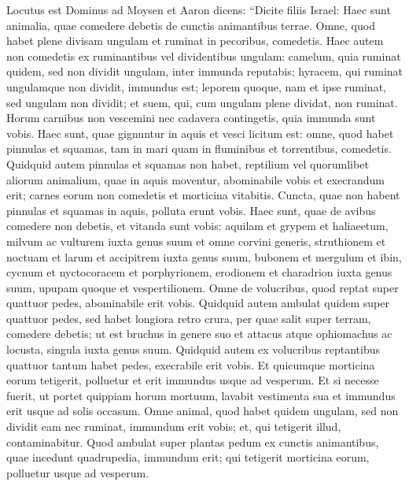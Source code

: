 \begin{biblechapter}  
\verse Locutus est Dominus ad Moysen et Aaron dicens: 
\verse “Dicite filiis Israel: Haec sunt animalia, quae comedere debetis de cunctis animantibus terrae. 
\verse Omne, quod habet plene divisam ungulam et ruminat in pecoribus, comedetis.  
\verse Haec autem non comedetis ex ruminantibus vel dividentibus ungulam: camelum, quia ruminat quidem, sed non dividit ungulam, inter immunda reputabis; 
\verse hyracem, qui ruminat ungulamque non dividit, immundus est; 
\verse leporem quoque, nam et ipse ruminat, sed ungulam non dividit; 
\verse et suem, qui, cum ungulam plene dividat, non ruminat. 
\verse Horum carnibus non vescemini nec cadavera contingetis, quia immunda sunt vobis. 
\verse Haec sunt, quae gignuntur in aquis et vesci licitum est: omne, quod habet pinnulas et squamas, tam in mari quam in fluminibus et torrentibus, comedetis. 
\verse Quidquid autem pinnulas et squamas non habet, reptilium vel quorumlibet aliorum animalium, quae in aquis moventur, abominabile vobis 
\verse et execrandum erit; carnes eorum non comedetis et morticina vitabitis. 
\verse Cuncta, quae non habent pinnulas et squamas in aquis, polluta erunt vobis. 
\verse Haec sunt, quae de avibus comedere non debetis, et vitanda sunt vobis: aquilam et grypem et haliaeetum, 
\verse milvum ac vulturem iuxta genus suum  
\verse et omne corvini generis, 
\verse struthionem et noctuam et larum et accipitrem iuxta genus suum, 
\verse bubonem et mergulum et ibin, 
\verse cycnum et nyctocoracem et porphyrionem, 
\verse erodionem et charadrion iuxta genus suum, upupam quoque et vespertilionem. 
\verse Omne de volucribus, quod reptat super quattuor pedes, abominabile erit vobis. 
\verse Quidquid autem ambulat quidem super quattuor pedes, sed habet longiora retro crura, per quae salit super terram, 
\verse comedere debetis; ut est bruchus in genere suo et attacus atque ophiomachus ac locusta, singula iuxta genus suum. 
\verse Quidquid autem ex volucribus reptantibus quattuor tantum habet pedes, execrabile erit vobis. 
\verse Et quicumque morticina eorum tetigerit, polluetur et erit immundus usque ad vesperum. 
\verse Et si necesse fuerit, ut portet quippiam horum mortuum, lavabit vestimenta sua et immundus erit usque ad solis occasum. 
\verse Omne animal, quod habet quidem ungulam, sed non dividit eam nec ruminat, immundum erit vobis; et, qui tetigerit illud, contaminabitur. 
\verse Quod ambulat super plantas pedum ex cunctis animantibus, quae incedunt quadrupedia, immundum erit; qui tetigerit morticina eorum, polluetur usque ad vesperum.  

\end{biblechapter}
